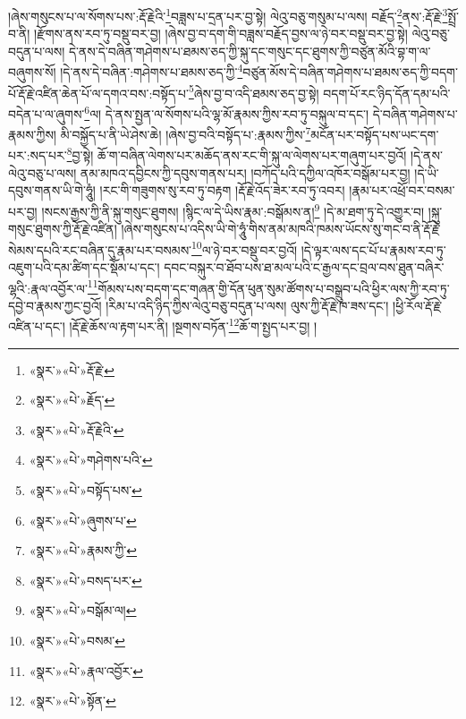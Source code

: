 །ཞེས་གསུངས་པ་ལ་སོགས་པས་:རྡོ་རྗེའི་\footnote{«སྣར་»«པེ་»རྡོ་རྗེ་}བཟླས་པ་དྲན་པར་བྱ་སྟེ། ལེའུ་བཅུ་གསུམ་པ་ལས། བརྗོད་\footnote{«སྣར་»«པེ་»རྗོད་}ནས་:རྡོ་རྗེ་\footnote{«སྣར་»«པེ་»རྡོ་རྗེའི་}སྤྲོ་བ་ནི། །རྫོགས་ནས་རབ་ཏུ་བསྡུ་བར་བྱ། །ཞེས་བྱ་བ་དག་གི་བཟླས་བརྗོད་བྱས་ལ་ཉེ་བར་བསྡུ་བར་བྱ་སྟེ། ལེའུ་བཅུ་བདུན་པ་ལས། དེ་ནས་དེ་བཞིན་གཤེགས་པ་ཐམས་ཅད་ཀྱི་སྐུ་དང་གསུང་དང་ཐུགས་ཀྱི་བཙུན་མོའི་བྷ་ག་ལ་བཞུགས་སོ། །དེ་ནས་དེ་བཞིན་:གཤེགས་པ་ཐམས་ཅད་ཀྱི་\footnote{«སྣར་»«པེ་»གཤེགས་པའི་}བཙུན་མོས་དེ་བཞིན་གཤེགས་པ་ཐམས་ཅད་ཀྱི་བདག་པོ་རྡོ་རྗེ་འཛིན་ཆེན་པོ་ལ་དགའ་བས་:བསྟོད་པ་\footnote{«སྣར་»«པེ་»བསྟོད་པས་}ཞེས་བྱ་བ་འདི་ཐམས་ཅད་བྱ་སྟེ། བདག་པོ་རང་ཉིད་དོན་དམ་པའི་བདེན་པ་ལ་ཞུགས་\footnote{«སྣར་»«པེ་»ཞུགས་པ་}ལ། དེ་ནས་སྤྱན་ལ་སོགས་པའི་ལྷ་མོ་རྣམས་ཀྱིས་རབ་ཏུ་བསྐུལ་བ་དང་། དེ་བཞིན་གཤེགས་པ་རྣམས་ཀྱིས། མི་བསྐྱོད་པ་ནི་ཡེ་ཤེས་ཆེ། །ཞེས་བྱ་བའི་བསྟོད་པ་:རྣམས་ཀྱིས་\footnote{«སྣར་»«པེ་»རྣམས་ཀྱི་}མངོན་པར་བསྟོད་པས་ཡང་དག་པར་:སད་པར་\footnote{«སྣར་»«པེ་»བསད་པར་}བྱ་སྟེ། ཆོ་ག་བཞིན་ལེགས་པར་མཆོད་ནས་རང་གི་སྐུ་ལ་ལེགས་པར་གཞུག་པར་བྱའོ། །དེ་ནས་ལེའུ་བཅུ་པ་ལས། ནམ་མཁའ་དབྱིངས་ཀྱི་དབུས་གནས་པར། །བཀོད་པའི་དཀྱིལ་འཁོར་བསྒོམ་པར་བྱ། །དེ་ཡི་དབུས་གནས་ཡི་གེ་ཧཱུཾ། །རང་གི་གཟུགས་སུ་རབ་ཏུ་བརྟག །རྡོ་རྗེ་འོད་ཟེར་རབ་ཏུ་འབར། །རྣམ་པར་འཕྲོ་བར་བསམ་པར་བྱ། །སངས་རྒྱས་ཀྱི་ནི་སྐུ་གསུང་ཐུགས། །སྙིང་ལ་དེ་ཡིས་རྣམ་:བསྒོམས་ན།\footnote{«སྣར་»«པེ་»བསྒོམ་ལ།} །དེ་མ་ཐག་ཏུ་དེ་འགྱུར་བ། །སྐུ་གསུང་ཐུགས་ཀྱི་རྡོ་རྗེ་འཛིན། །ཞེས་གསུངས་པ་འདིས་ཡི་གེ་ཧཱུཾ་གིས་ནམ་མཁའི་ཁམས་ཡོངས་སུ་གང་བ་ནི་རྡོ་རྗེ་སེམས་དཔའི་རང་བཞིན་དུ་རྣམ་པར་བསམས་\footnote{«སྣར་»«པེ་»བསམ་}ལ་ཉེ་བར་བསྡུ་བར་བྱའོ། །དེ་ལྟར་ལས་དང་པོ་པ་རྣམས་རབ་ཏུ་འཇུག་པའི་དམ་ཚིག་དང་སྡོམ་པ་དང་། དབང་བསྐུར་བ་ཐོབ་པས་ཐ་མལ་པའི་ང་རྒྱལ་དང་བྲལ་བས་ཐུན་བཞིར་ལྷའི་:རྣལ་འབྱོར་ལ་\footnote{«སྣར་»«པེ་»རྣལ་འབྱོར་}གོམས་པས་བདག་དང་གཞན་གྱི་དོན་ཕུན་སུམ་ཚོགས་པ་བསྒྲུབ་པའི་ཕྱིར་ལས་ཀྱི་རབ་ཏུ་དབྱེ་བ་རྣམས་ཀྱང་བྱའོ། །རིམ་པ་འདི་ཉིད་ཀྱིས་ལེའུ་བཅུ་བདུན་པ་ལས། ལུས་ཀྱི་རྡོ་རྗེ་ཁ་ཟས་དང་། །ཕྱི་རོལ་རྡོ་རྗེ་འཛིན་པ་དང་། །རྡོ་རྗེ་ཆོས་ལ་རྟག་པར་ནི། །སྔགས་བཏོན་\footnote{«སྣར་»«པེ་»སྟོན་}ཆོ་ག་སྤྱད་པར་བྱ། །
